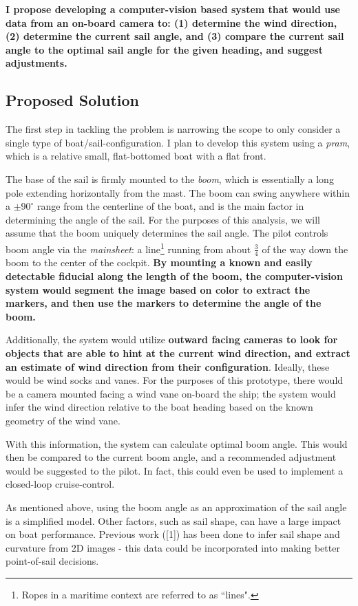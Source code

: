 \documentclass[letterpaper, 10 pt, conference]{ieeeconf}  %
\begin{document}
\textbf{I propose developing a computer-vision based system that would use data from an on-board camera to:
(1) determine the wind direction, (2) determine the current sail angle, and (3) compare the current sail angle to the optimal sail angle for the given heading, and suggest adjustments.}

\subsection{Proposed Solution}
The first step in tackling the problem is narrowing the scope to only consider a single type of boat/sail-configuration. I plan to develop this system using a \emph{pram}, which is a relative small, flat-bottomed boat  with a flat front. 

The base of the sail is firmly mounted to the \emph{boom}, which is essentially a long pole extending horizontally from the mast. The boom can swing anywhere within a $\pm 90^\circ$ range from the centerline of the boat, and is the main factor in determining the angle of the sail. For the purposes of this analysis, we will assume that the boom uniquely determines the sail angle. The pilot controls boom angle via the \emph{mainsheet}: a line\footnote{Ropes in a maritime context are referred to as ``lines".} running from about $\frac{3}{4}$ of the way down the boom to the center of the cockpit. \textbf{By mounting a known and easily detectable fiducial along the length of the boom, the computer-vision system would segment the image based on color to extract the markers, and then use the markers to determine the angle of the boom.}

Additionally, the system would utilize \textbf{outward facing cameras to look for objects that are able to hint at the current wind direction, and extract an estimate of wind direction from their configuration}. Ideally, these would be wind socks and vanes. For the purposes of this prototype, there would be a camera mounted facing a wind vane on-board the ship; the system would infer the wind direction relative to the boat heading based on the known geometry of the wind vane. 

With this information, the system can calculate optimal boom angle. This would then be compared to the current boom angle, and a recommended adjustment would be suggested to the pilot. In fact, this could even be used to implement a closed-loop cruise-control.

As mentioned above, using the boom angle as an approximation of the sail angle is a simplified model. Other factors, such as sail shape, can have a large impact on boat performance. Previous work ([1]) has been done to infer sail shape and curvature from 2D images - this data could be incorporated into making better point-of-sail decisions. 
\end{document}
